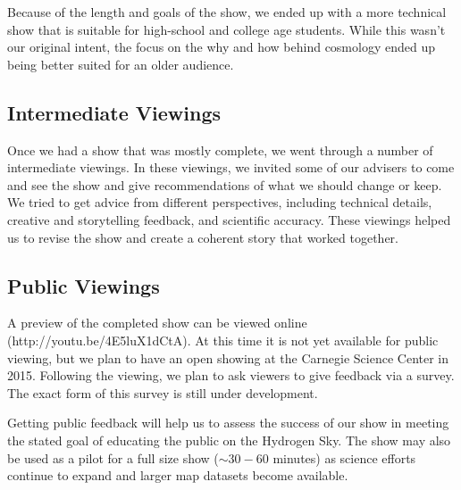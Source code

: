 Because of the length and goals of the show, we ended up with a more technical show that is suitable for high-school and college age students. While this wasn't our original intent, the focus on the why and how behind \cm cosmology ended up being better suited for an older audience. 


\subsection{Intermediate Viewings}

Once we had a show that was mostly complete, we went through a number of intermediate viewings. In these viewings, we invited some of our advisers to come and see the show and give recommendations of what we should change or keep. We tried to get advice from different perspectives, including technical details, creative and storytelling feedback, and scientific accuracy. These viewings helped us to revise the show and create a coherent story that worked together. 


\subsection{Public Viewings}

A preview of the completed show can be viewed online (http://youtu.be/4E5luX1dCtA). At this time it is not yet available for public viewing, but we plan to have an open showing at the Carnegie Science Center in 2015. Following the viewing, we plan to ask viewers to give feedback via a survey. The exact form of this survey is still under development. 

Getting public feedback will help us to assess the success of our show in meeting the stated goal of educating the public on the Hydrogen Sky. The show may also be used as a pilot for a full size show ($\sim 30-60$ minutes) as \cm science efforts continue to expand and larger \cm map datasets become available. 
